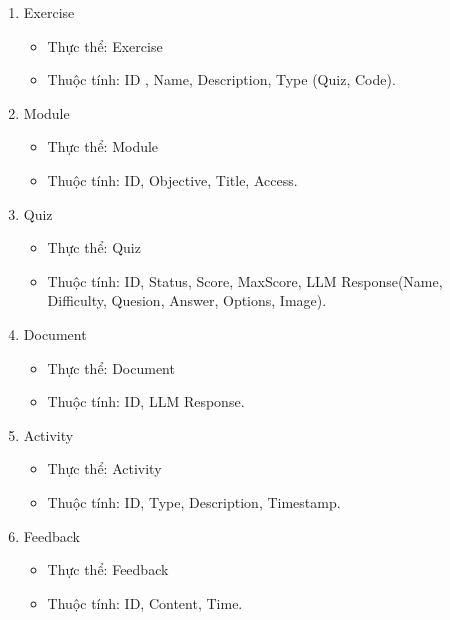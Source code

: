 \begin{enumerate}
    \item Exercise
    \begin{itemize}
        \item Thực thể: Exercise
        \item Thuộc tính: ID , Name, Description, Type (Quiz, Code).
    \end{itemize}
    \item Module
    \begin{itemize}
        \item Thực thể: Module
        \item Thuộc tính: ID, Objective, Title, Access.
    \end{itemize}
    \item Quiz
    \begin{itemize}
        \item Thực thể: Quiz
        \item Thuộc tính: ID, Status, Score, MaxScore, LLM Response(Name, Difficulty, Quesion, Answer, Options, Image).
    \end{itemize}
    \item Document
     \begin{itemize}
        \item Thực thể: Document
        \item Thuộc tính: ID, LLM Response.
    \end{itemize}
    \item Activity
     \begin{itemize}
        \item Thực thể: Activity    
        \item Thuộc tính: ID, Type, Description, Timestamp.
    \end{itemize}
    \item Feedback
     \begin{itemize}
        \item Thực thể: Feedback    
        \item Thuộc tính: ID, Content, Time.
    \end{itemize}
\end{enumerate}
